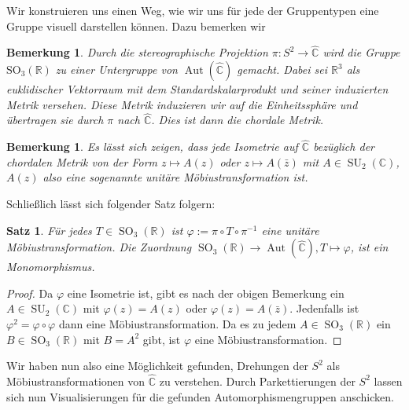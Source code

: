 \documentclass[12pt,a4paper]{article}
\theoremstyle{plain}
\newtheorem{Satz}[Theorem]{Satz}
\newtheorem{Bemerkung}[Theorem]{Bemerkung}
\newcommand{\R}{\mathbb{R}}
\newcommand{\C}{\mathbb{C}}
\newcommand{\Ch}{\hat{\C}}
\numberwithin{equation}{section}
\begin{document}
Wir konstruieren uns einen Weg, wie wir uns für jede der Gruppentypen eine Gruppe visuell darstellen können. Dazu bemerken wir
\begin{Bemerkung} Durch die stereographische Projektion $\pi:S^2\rightarrow \Ch$ wird die Gruppe $\operatorname{SO_3(\R)}$ zu einer Untergruppe von $\operatorname{Aut}(\Ch)$ gemacht. Dabei sei $\R^3$ als euklidischer Vektorraum mit dem Standardskalarprodukt und seiner induzierten Metrik versehen. Diese Metrik induzieren wir auf die Einheitssphäre und übertragen sie durch $\pi$ nach $\Ch$. Dies ist dann die \emph{chordale Metrik}.
\end{Bemerkung}
\begin{Bemerkung}
Es lässt sich zeigen, dass jede Isometrie auf $\Ch$ bezüglich der chordalen Metrik von der Form $z\mapsto A(z)$ oder $z\mapsto A(\bar{z})$ mit $A\in \operatorname{SU}_2(\C)$, $A(z)$ also eine sogenannte \emph{unitäre} Möbiustransformation ist.
\end{Bemerkung}
Schließlich lässt sich folgender Satz folgern:
\begin{Satz}
Für jedes $T\in\operatorname{SO}_3(\R)$ ist $\varphi:=\pi\circ T\circ\pi^{-1}$ eine unitäre Möbiustransformation. Die Zuordnung $\operatorname{SO}_3(\R) \rightarrow \operatorname{Aut}(\Ch), T\mapsto \varphi$, ist ein Monomorphismus.
\end{Satz}
\begin{proof}
Da $\varphi$ eine Isometrie ist, gibt es nach der obigen Bemerkung ein $A\in\operatorname{SU}_2(\C)$ mit $\varphi(z) = A(z)$ oder $\varphi(z)=A(\bar{z})$. Jedenfalls ist $\varphi^2 = \varphi\circ\varphi$ dann eine Möbiustransformation. Da es zu jedem $A\in\operatorname{SO}_3(\R)$ ein $B\in\operatorname{SO}_3(\R)$ mit $B=A^2$ gibt, ist $\varphi$ eine Möbiustransformation.
\end{proof}
Wir haben nun also eine Möglichkeit gefunden, Drehungen der $S^2$ als Möbius\-trans\-for\-ma\-tio\-nen von $\Ch$ zu verstehen. 
Durch Parkettierungen der $S^2$ lassen sich nun Visualisierungen für die gefunden Automorphismengruppen anschicken.
\end{document}
